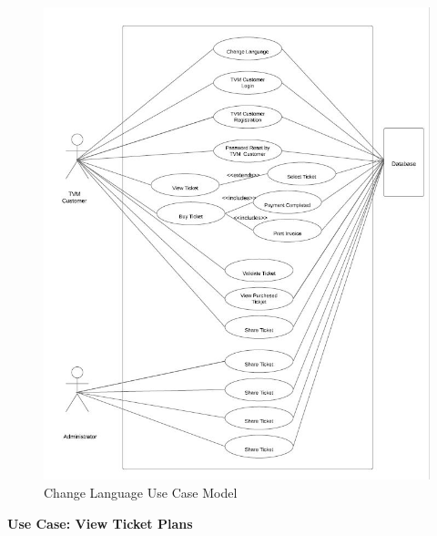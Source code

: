 \documentclass[a4paper,12pt]{report}
\begin{document}
\begin{figure}[!htb]
	\includegraphics[width=1\textwidth]{Use_Case_Diagrams/ChangeLanguage.JPG}
	\caption{\label{fig:Use Case Model : } Change Language Use Case Model}	
\end{figure} 

\vspace{0.5cm}
\textbf{\large Use Case: View Ticket Plans}
\\
\end{document}
